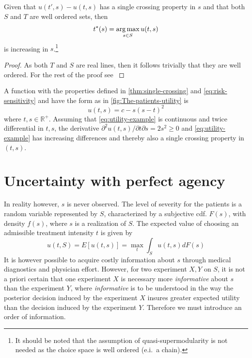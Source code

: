 \documentclass[10pt,a4paper]{article} 					%
\begin{document}
\begin{prop}
Given that $u(t',s)-u(t,s)$ has a single crossing property in $s$ and that both $S$ and $T$ are well ordered sets, then
\[
	t^{*}(s)=\argmax_{s\in S}u(t,s)\label{eq:increasing-solution}
\]
is increasing in $s$.\footnote{It should be noted that the assumption of quasi-supermodularity is not needed as the choice space is well ordered (e.i.\ a chain).}
\end{prop}

\begin{proof}
As both $T$ and $S$ are real lines, then it follows trivially that they are well ordered. For the rest of the proof see \textcite{Milgrom1994}
\end{proof}

\begin{example}
A function with the properties defined in \cref{thm:single-crossing} and \cref{eq:risk-sensitivity} and have the form as in \cref{fig:The-patients-utility} is
\[
	u(t,s) = c-s{(s-t)}^{2}\label{eq:utility-example}
\]
where $t,s\in\mathbb{R}^{+}$. Assuming that \cref{eq:utility-example} is continuous and twice differential in $t,s$, the derivative $\partial^{2}u(t,s)\big/\partial t\partial s=2s^{2}\ge0$ and \cref{eq:utility-example} has increasing differences and thereby also a single crossing property in $(t,s)$.
\end{example}


\section{Uncertainty with perfect agency}

In reality however, $s$ is never observed. The level of severity for the patients is a random variable represented by $S$, characterized by a subjective cdf. $F(s)$, with density $f(s)$, where $s$ is a realization of $S$. The expected value of choosing an admissible treatment intensity $t$ is given by
\[
	u(t,S)=E[u(t,s)]=\max_{t}\int_{S}u(t,s)dF(s)\label{eq:expected-utility-prior}
\]
It is however possible to acquire costly information about $s$ through medical diagnostics and physician effort. However, for two experiment $X,Y$ on $S$, it is not a priori certain that one experiment $X$ is necessary more \emph{informative} about $s$ than the experiment $Y$, where \emph{informative} is to be understood in the way the posterior decision induced by the experiment $X$ insures greater expected utility than the decision induced by the experiment $Y$. Therefore we must introduce an order of information.
\end{document}

